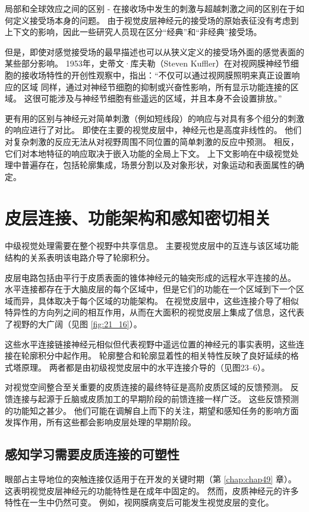 局部和全球效应之间的区别 - 在接收场中发生的刺激与超越刺激之间的区别在于如何定义接受场本身的问题。 
由于视觉皮层神经元的接受场的原始表征没有考虑到上下文的影响，因此一些研究人员现在区分“经典”和“非经典”接受场。


但是，即使对感觉接受场的最早描述也可以从狭义定义的接受场外面的感觉表面的某些部分影响。 
1953年，史蒂文·库夫勒（Steven Kuffler）在对视网膜神经节细胞的接收场特性的开创性观察中，指出：“不仅可以通过视网膜照明来真正设置响应的区域 同样，通过对神经节细胞的抑制或兴奋性影响，所有显示功能连接的区域。 
这很可能涉及与神经节细胞有些遥远的区域，并且本身不会设置排放。”


更有用的区别与神经元对简单刺激（例如短线段）的响应与对具有多个组分的刺激的响应进行了对比。
即使在主要的视觉皮层中，神经元也是高度非线性的。 
他们对复杂刺激的反应无法从对视野周围不同位置的简单刺激的反应中预测。
相反，它们对本地特征的响应取决于嵌入功能的全局上下文。
上下文影响在中级视觉处理中普遍存在，包括轮廓集成，场景分割以及对象形状，对象运动和表面属性的确定。



\section{皮层连接、功能架构和感知密切相关}
中级视觉处理需要在整个视野中共享信息。
主要视觉皮层中的互连与该区域功能结构的关系表明该电路介导了轮廓积分。


皮层电路包括由平行于皮质表面的锥体神经元的轴突形成的远程水平连接的丛。
水平连接都存在于大脑皮层的每个区域中，但是它们的功能在一个区域到下一个区域而异，具体取决于每个区域的功能架构。
在视觉皮层中，这些连接介导了相似特异性的方向列之间的相互作用，从而在大面积的视觉皮层上集成了信息，这代表了视野的大广阔（见图 \ref{fig:21_16}）。


这些水平连接链接神经元相似但代表视野中遥远位置的神经元的事实表明，这些连接在轮廓积分中起作用。
轮廓整合和轮廓显着性的相关特性反映了良好延续的格式塔原理。 两者都是由初级视觉皮层中的水平连接介导的（见图23–6）。


对视觉空间整合至关重要的皮质连接的最终特征是高阶皮质区域的反馈预测。
反馈连接与起源于丘脑或皮质加工的早期阶段的前馈连接一样广泛。
这些反馈预测的功能知之甚少。
他们可能在调解自上而下的关注，期望和感知任务的影响方面发挥作用，所有这些都会影响皮层处理的早期阶段。



\subsection{感知学习需要皮质连接的可塑性}
眼部占主导地位的突触连接仅适用于在开发的关键时期（第 \ref{chap:chap49} 章）。
这表明视觉皮层神经元的功能特性是在成年中固定的。 
然而，皮质神经元的许多特性在一生中仍然可变。
例如，视网膜病变后可能发生视觉皮层的变化。


